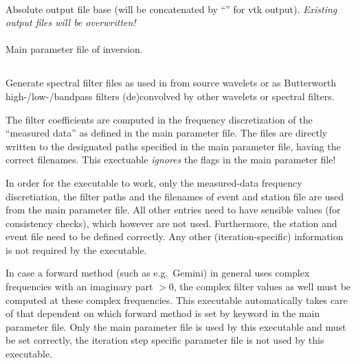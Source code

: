 \paragraph{}
Absolute output file base (will be concatenated by ``'' for vtk output). \emph{Existing output files 
will be overwritten!}
\paragraph{}
Main parameter file of inversion.

%
\subsection{} \label{programs_scripts,sec:bin_prog,sec:create_spec_filters}
Generate spectral filter files as used in \ASKI{} from source wavelets or as Butterworth
high-/low-/bandpass filters (de)convolved by other wavelets or spectral filters.

The filter coefficients are computed in the frequency discretization of the ``measured data'' as defined
in the main parameter file. The files are directly written to the designated paths specified in the main parameter
file, having the correct filenames. This exectuable \emph{ignores} the flags 
in the main parameter file! 

In order for the executable to work, only the measured-data frequency discretiation, the filter paths and the filenames
of event and station file are used from the main parameter file. All other entries need to have sensible values (for consistency
checks), which however are not used.
Furthermore, the station and event file need to be defined correctly. Any other (iteration-specific) information is not
required by the executable.

In case a forward method (such as e.g.\ Gemini) in general uses complex frequencies with an imaginary part $> 0$, 
the complex filter values as well must be computed at these complex frequencies.
This executable automatically takes care of that dependent on which forward method is set by 
keyword  in the main parameter file. Only the main parameter file is used by
this executable and must be set correctly, the iteration step specific parameter file is not used by
this executable. 

